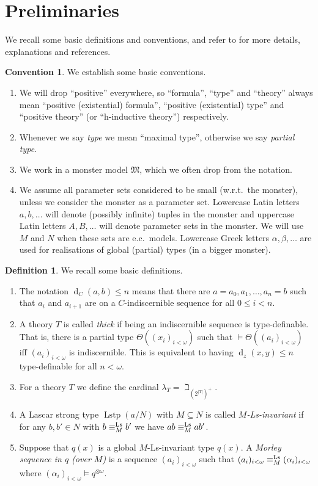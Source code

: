 \documentclass[a4paper, reqno]{amsart}
\theoremstyle{definition}
\newtheorem{definition}[theorem]{Definition}
\newtheorem{convention}[theorem]{Convention}
\theoremstyle{repeat}
\newcommand{\MM}{\mathfrak{M}}
\DeclareMathOperator{\Lstp}{Lstp}
\renewcommand{\d}{\operatorname{d}}
\newcommand{\equivls}{\equiv^\textup{Ls}}
\begin{document}
\section{Preliminaries}
\label{sec:preliminaries}
We recall some basic definitions and conventions, and refer to \cite[Sections 2 and 3]{dobrowolski_kim-independence_2022} for more details, explanations and references.
\begin{convention}
We establish some basic conventions.
\begin{enumerate}[label=(\roman*)]
\item We will drop ``positive'' everywhere, so ``formula'', ``type'' and ``theory'' always mean ``positive (existential) formula'', ``positive (existential) type'' and ``positive theory'' (or ``h-inductive theory'') respectively.
\item Whenever we say \emph{type} we mean ``maximal type'', otherwise we say \emph{partial type}.
\item We work in a monster model $\MM$, which we often drop from the notation.
\item We assume all parameter sets considered to be small (w.r.t.\ the monster), unless we consider the monster as a parameter set. Lowercase Latin letters $a, b, \ldots$ will denote (possibly infinite) tuples in the monster and uppercase Latin letters $A, B, \ldots$ will denote parameter sets in the monster. We will use $M$ and $N$ when these sets are e.c.\ models. Lowercase Greek letters $\alpha, \beta, \ldots$ are used for realisations of global (partial) types (in a bigger monster).
\end{enumerate}
\end{convention}
\begin{definition}
We recall some basic definitions.
\begin{enumerate}[label=(\roman*)]
\item The notation $\d_C(a, b) \leq n$ means that there are $a = a_0, a_1, \ldots, a_n = b$ such that $a_i$ and $a_{i+1}$ are on a $C$-indiscernible sequence for all $0 \leq i < n$.
\item A theory $T$ is called \emph{thick} if being an indiscernible sequence is type-definable. That is, there is a partial type $\Theta((x_i)_{i < \omega})$ such that $\models \Theta((a_i)_{i < \omega})$ iff $(a_i)_{i < \omega}$ is indiscernible. This is equivalent to having $\d_z(x, y) \leq n$ type-definable for all $n < \omega$.
\item For a theory $T$ we define the cardinal $\lambda_T = \beth_{(2^{|T|})^+}$.
\item A Lascar strong type $\Lstp(a/N)$ with $M \subseteq N$ is called \emph{$M$-Ls-invariant} if for any $b, b' \in N$ with $b \equivls_M b'$ we have $ab \equivls_M ab'$.
\item Suppose that $q(x)$ is a global $M$-Ls-invariant type $q(x)$. A \emph{Morley sequence in $q$ (over $M$)} is a sequence $(a_i)_{i < \omega}$ such that $(a_i)_{i < \omega} \equivls_M (\alpha_i)_{i < \omega}$ where $(\alpha_i)_{i < \omega} \models q^{\otimes \omega}$.
\end{enumerate}
\end{definition}
\end{document}
